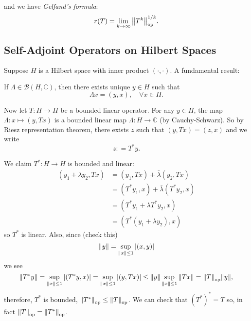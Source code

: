 \documentclass[a4paper,11pt]{article}
\begin{document}
	\begin{center}
	\end{center}
	and we have \emph{Gelfand's formula}:
	\[
		r(T) = \lim _{k \to \infty} \norm{T^k}_{\text{op}}^{1/k}.
	\]
	
	\subsection{Self-Adjoint Operators on Hilbert Spaces}

	Suppose $H$ is a Hilbert space with inner product $(\cdot, \cdot)$. A fundamental result: 
	\begin{thm}
		If $\Lambda \in \mathcal{B}(H, \mathbb{C})$, then there exists unique $y \in H$ such that 
		\[
			\Lambda x = (y,x), \quad \forall x \in H.
		\]
	\end{thm}

	Now let $T: H \to H$ be a bounded linear operator. For any $y \in H$, the map $\Lambda : x \mapsto (y, Tx)$ is a bounded linear map $\Lambda : H \to \mathbb{C}$ (by Cauchy-Schwarz). So by Riesz representation theorem, there exists $z$ such that $(y, Tx) = (z,x)$ and we write $$z : = T^* y.$$ 
	
	We claim $T^* : H \to H$ is bounded and linear: 
	\begin{align*}
		(y_1 + \lambda y_2 , Tx) & = (y_1, Tx) + \bar \lambda (y_2 , Tx) \\
		& = (T^* y_1 ,x) + \bar \lambda (T^* y_2, x)\\
		& = (T^* y_1 + \lambda T^* y_2, x)\\
		& = (T^* (y_1 + \lambda y_2), x)
	\end{align*}
	so $T^*$ is linear. Also, since (check this)
	\[
		\norm{y} = \sup _{\norm{x} \leq 1} \abs{(x,y)}
	\]
	we see 
	\[
		\norm{T^* y} = \sup _{\norm{x} \leq 1} \abs{(T^* y , x)} = \sup _{\norm{x} \leq 1} \abs{(y , Tx)} \leq \norm{y} \sup _{\norm{x} \leq 1} \norm{T x} = \norm{T}_{\text{op}} \norm{y},
	\]
	therefore, $T^*$ is bounded, $\norm{T^*}_{\text{op}} \leq \norm{T}_{\text{op}}$. We can check that $(T^*)^* = T$ so, in fact $\norm{T}_{\text{op}} = \norm{T^*}_{\text{op}}$.
\end{document}
